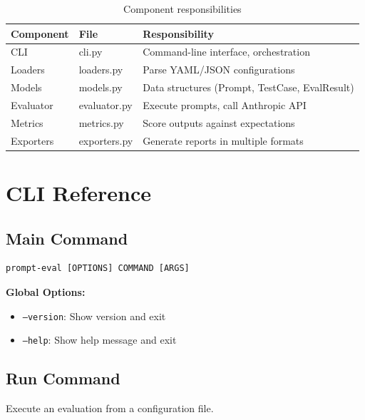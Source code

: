 \documentclass[11pt,a4paper]{report}
\begin{document}
\begin{table}[h]
\centering
\begin{tabular}{@{}llp{7cm}@{}}
\toprule
\textbf{Component} & \textbf{File} & \textbf{Responsibility} \\
\midrule
CLI & cli.py & Command-line interface, orchestration \\
Loaders & loaders.py & Parse YAML/JSON configurations \\
Models & models.py & Data structures (Prompt, TestCase, EvalResult) \\
Evaluator & evaluator.py & Execute prompts, call Anthropic API \\
Metrics & metrics.py & Score outputs against expectations \\
Exporters & exporters.py & Generate reports in multiple formats \\
\bottomrule
\end{tabular}
\caption{Component responsibilities}
\end{table}


\chapter{CLI Reference}

\section{Main Command}

\begin{lstlisting}[style=bash]
prompt-eval [OPTIONS] COMMAND [ARGS]
\end{lstlisting}

\textbf{Global Options:}
\begin{itemize}
    \item \texttt{--version}: Show version and exit
    \item \texttt{--help}: Show help message and exit
\end{itemize}

\section{Run Command}

Execute an evaluation from a configuration file.
\end{document}
